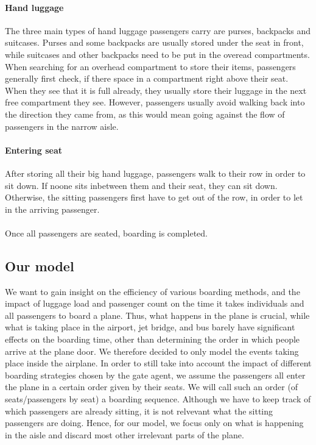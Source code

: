 \documentclass[11pt]{article}
\begin{document}
\paragraph{Hand luggage} The three main types of hand luggage passengers carry are purses, backpacks and suitcases. Purses and some backpacks are usually stored under the seat in front, while suitcases and other backpacks need to be put in the overead compartments. When searching for an overhead compartment to store their items, passengers generally first check, if there space in a compartment right above their seat. When they see that it is full already, they usually store their luggage in the next free compartment they see. However, passengers usually avoid walking back into the direction they came from, as this would mean going against the flow of passengers in the narrow aisle.

\paragraph{Entering seat} After storing all their big hand luggage, passengers walk to their row in order to sit down. If noone sits inbetween them and their seat, they can sit down. Otherwise, the sitting passengers first have to get out of the row, in order to let in the arriving passenger.
\\\\
Once all passengers are seated, boarding is completed.

\subsection{Our model}\label{ourmodel}

We want to gain insight on the efficiency of various boarding methods, and the impact of luggage load and passenger count on the time it takes individuals and all passengers to board a plane. Thus, what happens in the plane is crucial, while what is taking place in the airport, jet bridge, and bus barely have significant effects on the boarding time, other than determining the order in which people arrive at the plane door. We therefore decided to only model the events taking place inside the airplane. In order to still take into account the impact of different boarding strategies chosen by the gate agent, we assume the passengers all enter the plane in a certain order given by their seats. We will call such an order (of seats/passengers by seat) a boarding sequence.
Although we have to keep track of which passengers are already sitting, it is not relvevant what the sitting passengers are doing. Hence, for our model, we focus only on what is happening in the aisle and discard most other irrelevant parts of the plane.
\end{document}

